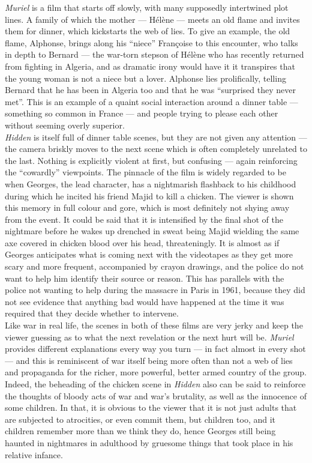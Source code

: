 \documentclass[12pt]{article}
\begin{document}
\textit{Muriel} is a film that starts off slowly, with many supposedly
intertwined plot lines. A family of which the mother --- Hélène ---
meets an old flame and invites them for dinner, which kickstarts the
web of lies.  To give an example, the old flame, Alphonse, brings
along his ``niece'' Françoise to this encounter, who talks in depth to
Bernard --- the war-torn stepson of Hélène who has recently returned
from fighting in Algeria, and as dramatic irony would have it it
transpires that the young woman is not a niece but a lover. Alphonse
lies prolifically, telling Bernard that he has been in Algeria too and
that he was ``surprised they never met''. This is an example of a
quaint social interaction around a dinner table --- something so
common in France --- and people trying to please each other without
seeming overly superior.\\

\textit{Hidden} is itself full of dinner table scenes, but they are
not given any attention --- the camera briskly moves to the next scene
which is often completely unrelated to the last. Nothing is explicitly
violent at first, but confusing --- again reinforcing the ``cowardly''
viewpoints. The pinnacle of the film is widely regarded \citep[p.\
22]{cache-book} to be when Georges, the lead character, has a
nightmarish flashback to his childhood during which he incited his
friend Majid to kill a chicken. The viewer is shown this memory in
full colour and gore, which is most definitely not shying away from
the event. It could be said that it is intensified by the final shot
of the nightmare before he wakes up drenched in sweat being Majid
wielding the same axe covered in chicken blood over his head,
threateningly. It is almost as if Georges anticipates what is coming
next with the videotapes as they get more scary and more frequent,
accompanied by crayon drawings, and the police do not want to help him
identify their source or reason. This has parallels with the police
not wanting to help during the massacre in Paris in 1961, because they
did not see evidence that anything bad would have happened at the time
it was required that they decide whether to intervene.\\

Like war in real life, the scenes in both of these films are very
jerky and keep the viewer guessing as to what the next revelation or
the next hurt will be. \textit{Muriel} provides different explanations
every way you turn --- in fact almost in every shot --- and this is
reminiscent of war itself being more often than not a web of lies and
propaganda for the richer, more powerful, better armed country of the
group. Indeed, the beheading of the chicken scene in \textit{Hidden}
also can be said to reinforce the thoughts of bloody acts of war and
war's brutality, as well as the innocence of some children. In that,
it is obvious to the viewer that it is not just adults that are
subjected to atrocities, or even commit them, but children too, and it
children remember more than we think they do, hence Georges still
being haunted in nightmares in adulthood by gruesome things that took
place in his relative infance.\\
\end{document}
